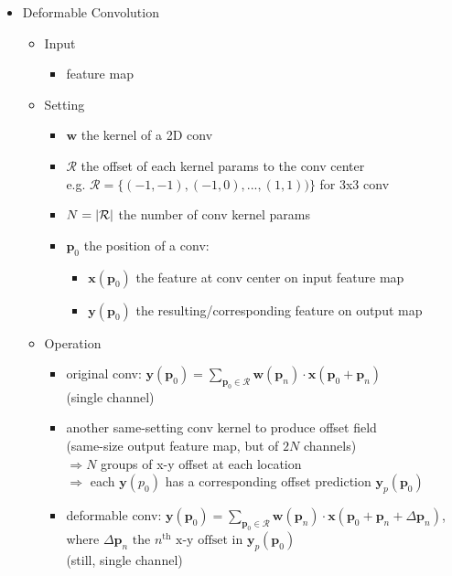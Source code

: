 \begin{itemize}
\item Deformable Convolution \label{DL_Layers_DeformableConv}
	\begin{itemize}
	\item Input
		\begin{itemize}
		\item feature map
		\end{itemize}
	\item Setting
		\begin{itemize}
		\item $\mathbf w$ the kernel of a 2D conv
		\item $\mathcal R$ the offset of each kernel params to the conv center \\
		e.g. $\mathcal R=\{(-1,-1), (-1,0), ..., (1,1))\}$ for 3x3 conv
		\item $N=\lvert\mathcal R\rvert$ the number of conv kernel params
		\item $\mathbf p_0$ the position of a conv:
			\begin{itemize}
			\item $\mathbf x(\mathbf p_0)$ the feature at conv center on input feature map
			\item $\mathbf y(\mathbf p_0)$ the resulting/corresponding feature on output map
			\end{itemize}
		\end{itemize}
	\item Operation
		\begin{itemize}
		\item original conv: $\mathbf y(\mathbf p_0)=\sum_{\mathbf p_0\in\mathcal R} \mathbf w(\mathbf p_n)\cdot \mathbf x(\mathbf p_0+\mathbf p_n)$ \\
		(single channel)
		\item another same-setting conv kernel to produce offset field \\
		(same-size output feature map, but of $2N$ channels) \\
		$\Rightarrow N$ groups of x-y offset at each location \\
		$\Rightarrow$ each $\mathbf y(p_0)$ has a corresponding offset prediction $\mathbf y_p(\mathbf p_0)$
		\item deformable conv: $\mathbf y(\mathbf p_0)=\sum_{\mathbf p_0\in\mathcal R} \mathbf w(\mathbf p_n)\cdot \mathbf x(\mathbf p_0+\mathbf p_n+\Delta \mathbf p_n)$, where $\Delta \mathbf p_n \text{ the } n^\text{th} \text{ x-y offset in } \mathbf y_p(\mathbf p_0)$ \\
		(still, single channel) \\

\end{itemize}
\end{itemize}
\end{itemize}
